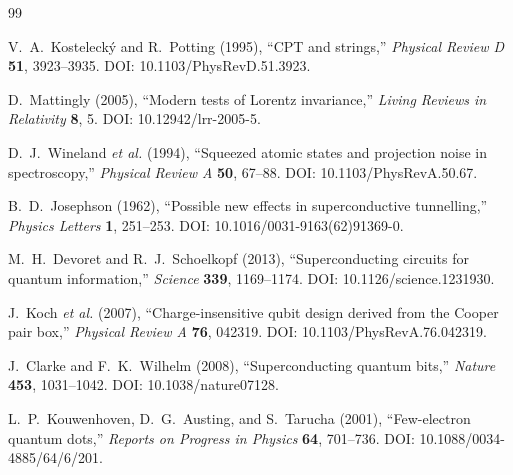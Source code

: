 \documentclass[11pt]{article}
\begin{document}

            \begin{thebibliography}{99}

                V.~A.~Kosteleck\'y and R.~Potting (1995),
                ``CPT and strings,''
                \emph{Physical Review D} \textbf{51}, 3923--3935.
                DOI: 10.1103/PhysRevD.51.3923.

                D.~Mattingly (2005),
                ``Modern tests of Lorentz invariance,''
                \emph{Living Reviews in Relativity} \textbf{8}, 5.
                DOI: 10.12942/lrr-2005-5.

                D.~J.~Wineland \emph{et al.} (1994),
                ``Squeezed atomic states and projection noise in spectroscopy,''
                \emph{Physical Review A} \textbf{50}, 67--88.
                DOI: 10.1103/PhysRevA.50.67.


                B.~D.~Josephson (1962),
                ``Possible new effects in superconductive tunnelling,''
                \emph{Physics Letters} \textbf{1}, 251--253.
                DOI: 10.1016/0031-9163(62)91369-0.

                M.~H.~Devoret and R.~J.~Schoelkopf (2013),
                ``Superconducting circuits for quantum information,''
                \emph{Science} \textbf{339}, 1169--1174.
                DOI: 10.1126/science.1231930.

                J.~Koch \emph{et al.} (2007),
                ``Charge-insensitive qubit design derived from the Cooper pair box,''
                \emph{Physical Review A} \textbf{76}, 042319.
                DOI: 10.1103/PhysRevA.76.042319.

                J.~Clarke and F.~K.~Wilhelm (2008),
                ``Superconducting quantum bits,''
                \emph{Nature} \textbf{453}, 1031--1042.
                DOI: 10.1038/nature07128.

                L.~P.~Kouwenhoven, D.~G.~Austing, and S.~Tarucha (2001),
                ``Few-electron quantum dots,''
                \emph{Reports on Progress in Physics} \textbf{64}, 701--736.
                DOI: 10.1088/0034-4885/64/6/201.


\end{thebibliography}
\end{document}
